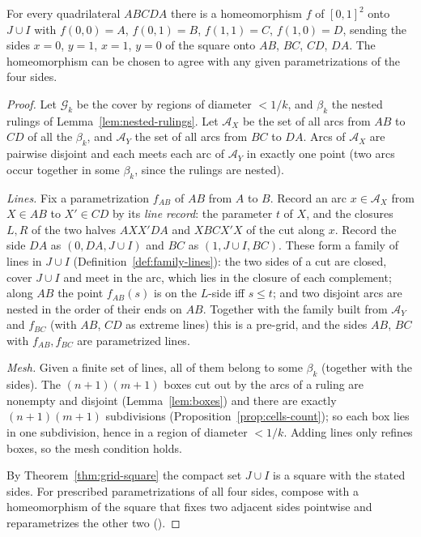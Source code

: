\begin{theorem}\label{thm:schoenflies}
For every quadrilateral $ABCDA$ there is a homeomorphism $f$ of $[0,1]^2$ onto $J\cup I$ with $f(0,0)=A$, $f(0,1)=B$, $f(1,1)=C$,
$f(1,0)=D$, sending the sides $x=0$, $y=1$, $x=1$, $y=0$ of the square onto $AB$, $BC$, $CD$, $DA$. The homeomorphism can be chosen
to agree with any given parametrizations of the four sides.
\end{theorem}

\begin{proof}
Let $\mathcal G_k$ be the cover by regions of diameter $<1/k$, and $\beta_k$ the nested rulings of Lemma~\ref{lem:nested-rulings}. Let
$\mathcal A_X$ be the set of all arcs from $AB$ to $CD$ of all the $\beta_k$, and $\mathcal A_Y$ the set of all arcs from $BC$ to $DA$. Arcs of
$\mathcal A_X$ are pairwise disjoint and each meets each arc of $\mathcal A_Y$ in exactly one point (two arcs occur together in some $\beta_k$,
since the rulings are nested).

\emph{Lines.} Fix a parametrization $f_{AB}$ of $AB$ from $A$ to $B$. Record an arc $x\in\mathcal A_X$ from $X\in AB$ to $X'\in CD$ by its
\emph{line record}: the parameter $t$ of $X$, and the closures $L,R$ of the two halves $AXX'DA$ and $XBCX'X$ of the cut along $x$. Record
the side $DA$ as $(0,DA,J\cup I)$ and $BC$ as $(1,J\cup I,BC)$. These form a family of lines in $J\cup I$ (Definition~\ref{def:family-lines}):
the two sides of a cut are closed, cover $J\cup I$ and meet in the arc, which lies in the closure of each complement; along $AB$ the point
$f_{AB}(s)$ is on the $L$-side iff $s\le t$; and two disjoint arcs are nested in the order of their ends on $AB$. Together with the family
built from $\mathcal A_Y$ and $f_{BC}$ (with $AB$, $CD$ as extreme lines) this is a pre-grid, and the sides $AB$, $BC$ with $f_{AB},f_{BC}$
are parametrized lines.

\emph{Mesh.} Given a finite set of lines, all of them belong to some $\beta_k$ (together with the sides). The $(n+1)(m+1)$ boxes cut out by
the arcs of a ruling are nonempty and disjoint (Lemma~\ref{lem:boxes}) and there are exactly $(n+1)(m+1)$ subdivisions
(Proposition~\ref{prop:cells-count}); so each box lies in one subdivision, hence in a region of diameter $<1/k$. Adding lines only refines
boxes, so the mesh condition holds.

By Theorem~\ref{thm:grid-square} the compact set $J\cup I$ is a square with the stated sides. For prescribed parametrizations of all four
sides, compose with a homeomorphism of the square that fixes two adjacent sides pointwise and reparametrizes the other two
().
\end{proof}

